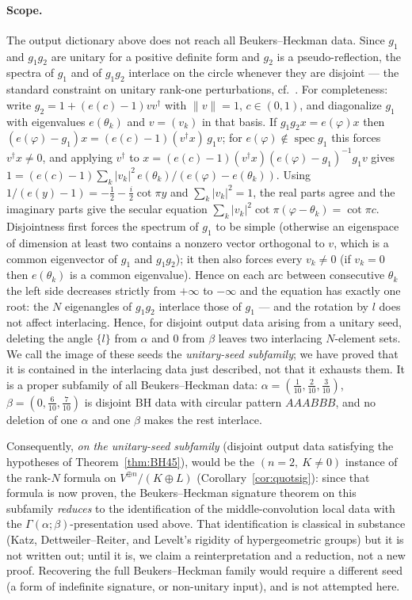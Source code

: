 \documentclass[11pt]{article}
\theoremstyle{definition}
\newcommand{\frc}[1]{\{#1\}}
\begin{document}
\paragraph{Scope.} The output dictionary above does not reach all
Beukers--Heckman data. Since $g_1$ and $g_1g_2$ are unitary for a
positive definite form and $g_2$ is a pseudo-reflection, the spectra
of $g_1$ and of $g_1g_2$ interlace on the circle whenever they are
disjoint --- the standard constraint on unitary rank-one
perturbations, cf.\ \cite[Thm.~3.14]{Heckman-lectures}. For
completeness: write $g_2=1+(e(c)-1)vv^{\dagger}$ with
$\lVert v\rVert=1$, $c\in(0,1)$, and diagonalize $g_1$ with
eigenvalues $e(\theta_k)$ and $v=(v_k)$ in that basis. If
$g_1g_2x=e(\varphi)x$ then $(e(\varphi)-g_1)x=(e(c)-1)(v^{\dagger}x)\,g_1v$;
for $e(\varphi)\notin\operatorname{spec}g_1$ this forces
$v^{\dagger}x\neq0$, and applying $v^{\dagger}$ to
$x=(e(c)-1)(v^{\dagger}x)(e(\varphi)-g_1)^{-1}g_1v$ gives
$1=(e(c)-1)\sum_k|v_k|^{2}\,e(\theta_k)/(e(\varphi)-e(\theta_k))$.
Using $1/(e(y)-1)=-\tfrac12-\tfrac i2\cot\pi y$ and
$\sum_k|v_k|^{2}=1$, the real parts agree and the imaginary parts
give the secular equation
$\sum_k|v_k|^{2}\cot\pi(\varphi-\theta_k)=\cot\pi c$. Disjointness
first forces the spectrum of $g_1$ to be simple (otherwise an
eigenspace of dimension at least two contains a nonzero vector
orthogonal to $v$, which is a common eigenvector of $g_1$ and
$g_1g_2$); it then also forces every $v_k\neq0$ (if $v_k=0$ then
$e(\theta_k)$ is a common eigenvalue). Hence on each arc between consecutive
$\theta_k$ the left side decreases strictly from $+\infty$ to
$-\infty$ and the equation has exactly one root: the $N$ eigenangles
of $g_1g_2$ interlace those of $g_1$
--- and the rotation by $l$ does not affect interlacing. Hence, for
disjoint output data arising from a unitary seed, deleting the angle
$\frc l$ from $\alpha$ and $0$ from $\beta$ leaves two interlacing
$N$-element sets. We call the image of these seeds the
\emph{unitary-seed subfamily}; we have proved that it is contained
in the interlacing data just described, not that it exhausts them. It
is a proper subfamily of all Beukers--Heckman data: $\alpha=(\tfrac1{10},\tfrac2{10},\tfrac3{10})$,
$\beta=(0,\tfrac6{10},\tfrac7{10})$ is disjoint BH data with circular
pattern $AAABBB$, and no deletion of one $\alpha$ and one $\beta$
makes the rest interlace.

Consequently, \emph{on the unitary-seed subfamily} (disjoint output
data satisfying the hypotheses of Theorem~\ref{thm:BH45}),
\cite[Thm.~4.5]{BH} would be the $(n=2,\ K\neq0)$ instance of the
rank-$N$ formula on $V^{\oplus n}/(K\oplus L)$
(Corollary~\ref{cor:quotsig}): since that formula is now proven, the
Beukers--Heckman signature theorem on this subfamily \emph{reduces}
to the identification of the middle-convolution local data with the
$\Gamma(\alpha;\beta)$-presentation used above. That identification is classical in substance (Katz,
Dettweiler--Reiter, and Levelt's rigidity of hypergeometric groups)
but it is not written out; until it is, we claim a reinterpretation and a reduction, not a new
proof. Recovering the full Beukers--Heckman family would require a
different seed (a form of indefinite signature, or non-unitary input),
and is not attempted here.
\end{document}
